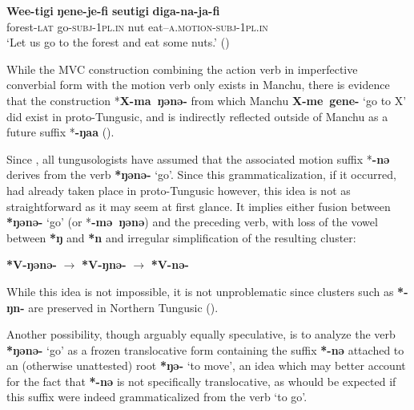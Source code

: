 \documentclass{article}
\newcommand{\ipa}[1]{\textbf{{\phon\mbox{#1}}}} %
\begin{document}
\begin{exe}
\ex \label{ex:ngenejefi}
\gll 
\ipa{Wee-tigi} 	\ipa{ŋene-je-fi} 	\ipa{seutigi} 	\ipa{diga-na-ja-fi} \\
forest-\textsc{lat} go-\textsc{subj-1pl.in} nut eat--\textsc{a.motion-subj-1pl.in} \\
\glt ‘Let us go to the forest and eat some nuts.’ (\citealt[121]{nikolaeva01udihe})
\end{exe}

While the MVC construction combining the action verb in imperfective converbial form with the motion verb only exists in Manchu, there is evidence that the construction *\ipa{X-ma ŋənə-} from which Manchu \ipa{X-me gene-} `go to X' did exist in proto-Tungusic, and is indirectly reflected outside of Manchu as a future suffix *\ipa{-ŋaa} (\citealt[40-50, 63-65]{fuente11tungusic}).

Since \citet[209-211]{kotwicz62altaj}, all tungusologists have assumed that the associated motion suffix *\ipa{-nə} derives from the verb \ipa{*ŋənə-} `go'. Since this grammaticalization, if it occurred, had already taken place in proto-Tungusic however, this idea is not as straightforward as it may seem at first glance. It implies either fusion between \ipa{*ŋənə-} `go' (or *\ipa{-mə ŋənə}) and the preceding verb, with loss of the vowel between \ipa{*ŋ} and \ipa{*n} and irregular simplification of the resulting cluster:

\begin{exe}
\ex 
\glt \ipa{*V-ŋənə-} $\rightarrow $ \ipa{*V-ŋnə-} $\rightarrow $  \ipa{*V-nə-} 
\end{exe}  

While this idea is not impossible, it is not unproblematic since clusters such as \ipa{*-ŋn-} are preserved in Northern Tungusic (\citealt[241-4]{cincius49fonetika}). 

Another possibility, though arguably equally speculative, is to analyze the verb \ipa{*ŋənə-} `go' as a frozen translocative form containing the suffix \ipa{*-nə} attached to an (otherwise unattested) root \ipa{*ŋə-} `to move', an idea which may better account for the fact that \ipa{*-nə} is not specifically translocative, as whould be expected if this suffix were indeed grammaticalized from the verb `to go'. 
\end{document}
